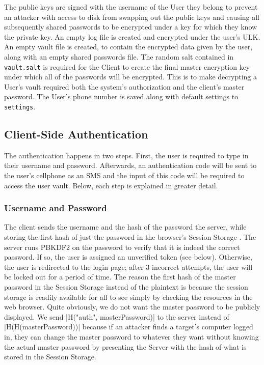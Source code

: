 \documentclass{article}
\begin{document}
\par The public keys are signed with the username of the User they belong to prevent an attacker with access to disk from swapping out the public keys and causing all subsequently shared passwords to be encrypted under a key for which they know the private key. An empty log file is created and encrypted under the user's ULK. An empty vault file is created, to contain the encrypted data given by the user, along with an empty shared passwords file. The random salt contained in \texttt{vault.salt} is required for the Client to create the final master encryption key under which all of the passwords will be encrypted. This is to make decrypting a User's vault required both the system's authorization and the client's master password. The User's phone number is saved along with default settings to \texttt{settings}.

\subsection{Client-Side Authentication}
\par The authentication happens in two steps. First, the user is required to type in their username and password. Afterwards, an authentication code will be sent to the user's cellphone as an SMS and the input of this code will be required to access the user vault. Below, each step is explained in greater detail.

\subsubsection{Username and Password}
\par The client sends the username and the hash of the password the server, while storing the first hash of just the password in the browser's Session Storage \cite{bib:session_storage}. The server runs PBKDF2 on the password to verify that it is indeed the correct password. If so, the user is assigned an unverified token (see below). Otherwise, the user is redirected to the login page; after 3 incorrect attempts, the user will be locked out for a period of time. The reason the first hash of the master password in the Session Storage instead of the plaintext is because the session storage is readily available for all to see simply by checking the resources in the web browser. Quite obviously, we do not want the master password to be publicly displayed. We send |H("auth", masterPassword)| to the server instead of |H(H(masterPassword))| because if an attacker finds a target's computer logged in, they can change the master password to whatever they want without knowing the actual master password by presenting the Server with the hash of what is stored in the Session Storage.
\end{document}
